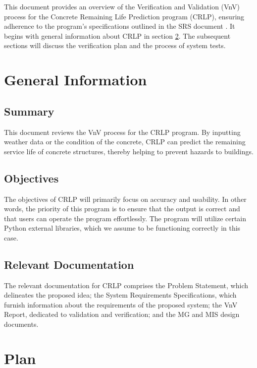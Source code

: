 \documentclass[12pt, titlepage]{article}
\begin{document}
\newpage


This document provides an overview of the Verification and Validation (VnV) process for the Concrete Remaining Life Prediction program (CRLP), ensuring adherence to the program's specifications outlined in the SRS document \cite{srs}. It begins with general information about CRLP in section \ref{sec:plan}. The subsequent sections will discuss the verification plan and the process of system tests.

\section{General Information}

\subsection{Summary}

This document reviews the VnV process for the CRLP program. By inputting weather data or the condition of the concrete, CRLP can predict the remaining service life of concrete structures, thereby helping to prevent hazards to buildings.

\subsection{Objectives}

The objectives of CRLP will primarily focus on accuracy and usability. In other words, the priority of this program is to ensure that the output is correct and that users can operate the program effortlessly. The program will utilize certain Python external libraries, which we assume to be functioning correctly in this case.

\subsection{Relevant Documentation}

The relevant documentation for CRLP comprises the Problem Statement, which delineates the proposed idea; the System Requirements Specifications, which furnish information about the requirements of the proposed system; the VnV Report, dedicated to validation and verification; and the MG and MIS design documents.

\section{Plan}\label{sec:plan}
\end{document}
